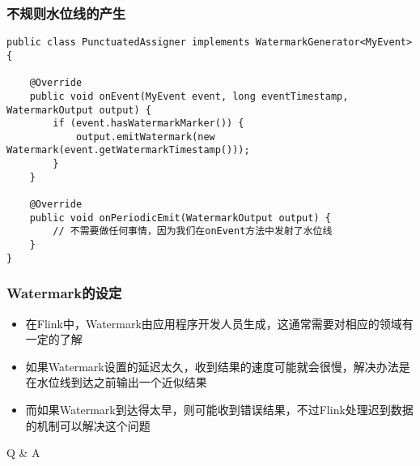 \documentclass{beamer}
\begin{document}
  \begin{frame}[fragile]
      \frametitle{不规则水位线的产生}
  
\begin{verbatim}
public class PunctuatedAssigner implements WatermarkGenerator<MyEvent> {

    @Override
    public void onEvent(MyEvent event, long eventTimestamp, WatermarkOutput output) {
        if (event.hasWatermarkMarker()) {
            output.emitWatermark(new Watermark(event.getWatermarkTimestamp()));
        }
    }

    @Override
    public void onPeriodicEmit(WatermarkOutput output) {
        // 不需要做任何事情，因为我们在onEvent方法中发射了水位线
    }
}
\end{verbatim}
  
  \end{frame}

  \begin{frame}
      \frametitle{Watermark的设定}

      \begin{itemize}
          \item 在Flink中，Watermark由应用程序开发人员生成，这通常需要对相应的领域有一定的了解
          \item 如果Watermark设置的延迟太久，收到结果的速度可能就会很慢，解决办法是在水位线到达之前输出一个近似结果
          \item 而如果Watermark到达得太早，则可能收到错误结果，不过Flink处理迟到数据的机制可以解决这个问题          
      \end{itemize}
  
  \end{frame}

  \begin{frame}[plain,c]
    
    \begin{center}
    \Huge Q \& A
    \end{center}
    
  \end{frame}
\end{document}
